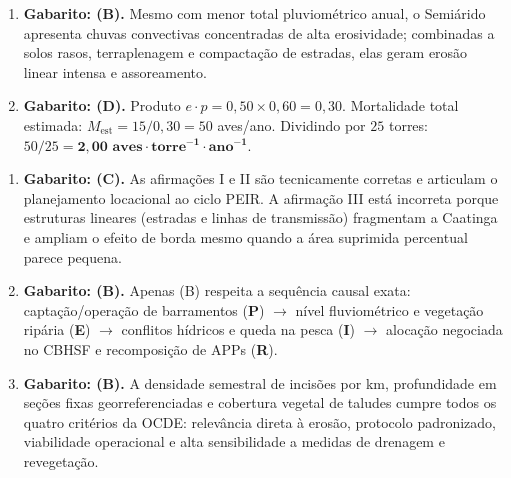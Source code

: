 \begin{boxGabarito}
\begin{enumerate}[leftmargin=1.6em, itemsep=4pt]
  \item \textbf{Gabarito: (B).} Mesmo com menor total pluviométrico anual, o Semiárido apresenta chuvas convectivas concentradas de alta erosividade; combinadas a solos rasos, terraplenagem e compactação de estradas, elas geram erosão linear intensa e assoreamento.
  \item \textbf{Gabarito: (D).} Produto $e \cdot p = 0{,}50 \times 0{,}60 = 0{,}30$. Mortalidade total estimada: $M_{\text{est}} = 15 / 0{,}30 = 50$ aves/ano. Dividindo por $25$ torres: $50 / 25 = \mathbf{2{,}00\text{ aves}\cdot\text{torre}^{-1}\cdot\text{ano}^{-1}}$.
\end{enumerate}
\end{boxGabarito}

\begin{boxGabarito}
\begin{enumerate}[leftmargin=1.6em, itemsep=4pt]
  \item \textbf{Gabarito: (C).} As afirmações I e II são tecnicamente corretas e articulam o planejamento locacional ao ciclo PEIR. A afirmação III está incorreta porque estruturas lineares (estradas e linhas de transmissão) fragmentam a Caatinga e ampliam o efeito de borda mesmo quando a área suprimida percentual parece pequena.
  \item \textbf{Gabarito: (B).} Apenas (B) respeita a sequência causal exata: captação/operação de barramentos (\textbf{P}) $\rightarrow$ nível fluviométrico e vegetação ripária (\textbf{E}) $\rightarrow$ conflitos hídricos e queda na pesca (\textbf{I}) $\rightarrow$ alocação negociada no CBHSF e recomposição de APPs (\textbf{R}).
  \item \textbf{Gabarito: (B).} A densidade semestral de incisões por km, profundidade em seções fixas georreferenciadas e cobertura vegetal de taludes cumpre todos os quatro critérios da OCDE: relevância direta à erosão, protocolo padronizado, viabilidade operacional e alta sensibilidade a medidas de drenagem e revegetação.
\end{enumerate}
\end{boxGabarito}

